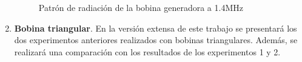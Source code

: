 \documentclass{intech}
\begin{document}
\begin{enumerate}
\begin{figure}[htbp]
\caption{Patr\'on de radiaci\'on de la bobina generadora a  1.4MHz}
\label{datos1}
\end{figure}
\item  {\bf Bobina triangular}. En la versi\'on extensa de este trabajo se presentar\'a los dos experimentos anteriores realizados con bobinas triangulares. Adem\'as,
se realizar\'a una comparaci\'on con los resultados de los experimentos 1  y 2.
\end{enumerate}
\end{document}
